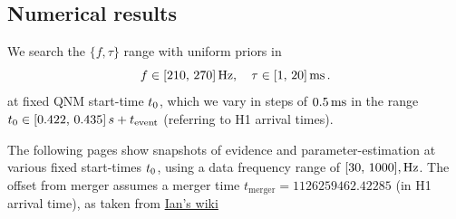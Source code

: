 \documentclass[aps,prd,onecolumn,notitlepage,nofootinbib,superscriptaddress,altaffilletter,floatfix]{revtex4-1}
\begin{document}
\newpage
\subsection{Numerical results}
\label{sec:numerical-results}

We search the $\{f,\tau\}$ range with uniform priors in
\begin{equation}
  \label{eq:33}
  f\in[210,\,270]\,\mathrm{Hz},\quad
  \tau\in[1,\,20]\,\mathrm{ms}\,.
\end{equation}
at fixed QNM start-time $t_0$, which we vary in steps of $0.5\,\mathrm{ms}$ in the range $t_0\in [0.422,\,0.435]\,s + t_{\mathrm{event}}$
(referring to H1 arrival times).

The following pages show snapshots of evidence and parameter-estimation at various fixed start-times $t_0$, using a data frequency range of $[30,\,1000],\mathrm{Hz}$.
The offset from merger assumes a merger time $t_{\mathrm{merger}} =  1126259462.42285$ (in H1 arrival time), as taken from \href{https://www.lsc-group.phys.uwm.edu/ligovirgo/cbcnote/TestingGR/O1/G184098/ringdown_presence}{Ian's wiki}
\end{document}
